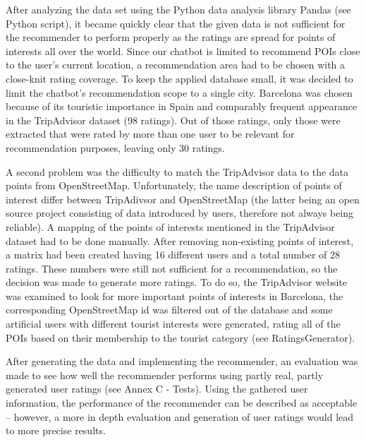 After analyzing the data set using the Python data analysis library Pandas (see Python script), it became quickly clear that the given data is not sufficient for the recommender to perform properly as the ratings are spread for points of interests all over the world. Since our chatbot is limited to recommend POIs close to the user’s current location, a recommendation area had to be chosen with a close-knit rating coverage. To keep the applied database small, it was decided to limit the chatbot’s recommendation scope to a single city. Barcelona was chosen because of its touristic importance in Spain and comparably frequent appearance in the TripAdvisor dataset (98 ratings). Out of those ratings, only those were extracted that were rated by more than one user to be relevant for recommendation purposes, leaving only 30 ratings.

A second problem was the difficulty to match the TripAdvisor data to the data points from OpenStreetMap. Unfortunately, the name description of points of interest differ between TripAdivsor and OpenStreetMap (the latter being an open source project consisting of data introduced by users, therefore not always being reliable). A mapping of the points of interests mentioned in the TripAdvisor dataset had to be done manually. After removing non-existing points of interest, a matrix had been created having 16 different users and a total number of 28 ratings. These numbers were still not sufficient for a recommendation, so the decision was made to generate more ratings.  To do so, the TripAdvisor website was examined to look for more important points of interests in Barcelona, the corresponding OpenStreetMap id was filtered out of the database and some artificial users with different tourist interests were generated, rating all of the POIs based on their membership to the tourist category (see RatingsGenerator).

After generating the data and implementing the recommender, an evaluation was made to see how well the recommender performs using partly real, partly generated user ratings (see Annex C - Tests). Using the gathered user information, the performance of the recommender can be described as acceptable – however, a more in depth evaluation and generation of user ratings would lead to more precise results.

